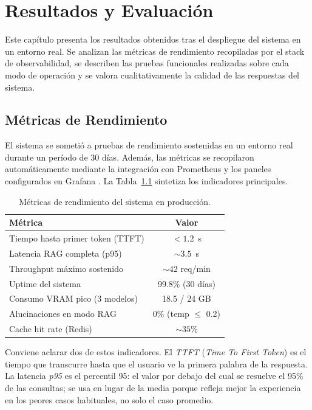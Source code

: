 \chapter{Resultados y Evaluación}
\label{cap:resultados}

Este capítulo presenta los resultados obtenidos tras el despliegue del sistema en un entorno real. Se analizan las métricas de rendimiento recopiladas por el stack de observabilidad, se describen las pruebas funcionales realizadas sobre cada modo de operación y se valora cualitativamente la calidad de las respuestas del sistema.

\section{Métricas de Rendimiento}

El sistema se sometió a pruebas de rendimiento sostenidas en un entorno real durante un período de 30 días. Además, las métricas se recopilaron automáticamente mediante la integración con Prometheus y los paneles configurados en Grafana \cite{prometheus2026docs,grafana2026docs}. La Tabla~\ref{tab:metricas-resultado} sintetiza los indicadores principales.

\begin{table}[H]
\centering
\caption{Métricas de rendimiento del sistema en producción.}
\label{tab:metricas-resultado}
\begin{tabular}{lc}
\toprule
\textbf{Métrica} & \textbf{Valor} \\
\midrule
Tiempo hasta primer token (TTFT) & $< 1.2$~s \\
Latencia RAG completa (p95)       & $\sim 3.5$~s \\
Throughput máximo sostenido       & $\sim 42$ req/min \\
Uptime del sistema                & 99.8\% (30 días) \\
Consumo VRAM pico (3 modelos)     & 18.5 / 24 GB \\
Alucinaciones en modo RAG         & 0\% (temp $\leq$ 0.2) \\
Cache hit rate (Redis)            & $\sim 35$\% \\
\bottomrule
\end{tabular}
\end{table}

Conviene aclarar dos de estos indicadores. El \textit{TTFT} (\textit{Time To First Token}) es el tiempo que transcurre hasta que el usuario ve la primera palabra de la respuesta. La latencia \textit{p95} es el percentil 95: el valor por debajo del cual se resuelve el 95\% de las consultas; se usa en lugar de la media porque refleja mejor la experiencia en los peores casos habituales, no solo el caso promedio.

